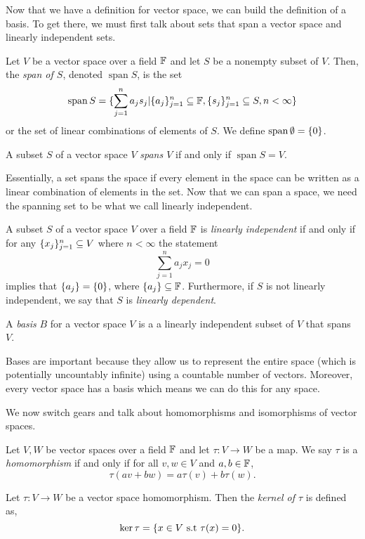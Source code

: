 \documentclass[notitlepage]{simple}
\def\spann{\operatorname{span}}
\begin{document}
	Now that we have a definition for vector space, we can build the definition of a basis.
	To get there, we must first talk about sets that span a vector space and linearly independent sets.

	\begin{definition}
		Let $V$ be a vector space over a field $\mathbb{F}$ and let $S$ be a nonempty subset of $V$.
		Then, the \textit{span of $S$}, denoted $\spann S$, is the set
		\[
			\spann S = \set{\sum_{j=1}^n a_j s_j | \set{a_j}_{j=1}^n\subseteq\FF, \set{s_j}_{j=1}^n\subseteq S, n<\infty}
		\]
		or the set of linear combinations of elements of $S$.
		We define $\spann\emptyset = \set{0}$.
	\end{definition}

	\begin{definition}[Span]
		A subset $S$ of a vector space $V$ \textit{spans $V$} if and only if $\spann S=V$.
	\end{definition}

	Essentially, a set spans the space if every element in the space can be written as a linear combination of elements in the set.
	Now that we can span a space, we need the spanning set to be what we call linearly independent.

	\begin{definition}
		A subset $S$ of a vector space $V$ over a field $\mathbb{F}$ is \textit{linearly independent} if and only if for any $\lbrace x_j \rbrace_{j=1}^n\subseteq V$ where $n<\infty$ the statement
		\[
			\sum_{j=1}^n a_jx_j=0
		\]
		implies that $\lbrace a_j \rbrace=\lbrace 0 \rbrace$, where $\lbrace a_j \rbrace\subseteq\mathbb{F}$.
		Furthermore, if $S$ is not linearly independent, we say that $S$ is \textit{linearly dependent}.
	\end{definition}

	\begin{definition}
		A \textit{basis} $B$ for a vector space $V$ is a a linearly independent subset of $V$ that spans $V$.
	\end{definition}

	Bases are important because they allow us to represent the entire space (which is potentially uncountably infinite) using a countable number of vectors.
	Moreover, every vector space has a basis which means we can do this for any space.

	We now switch gears and talk about homomorphisms and isomorphisms of vector spaces.

	\begin{definition}
		Let $V,W$ be vector spaces over a field $\mathbb{F}$ and let $\tau:V\rightarrow W$ be a map.
		We say $\tau$ is a \textit{homomorphism} if and only if for all $v,w\in V$ and $a,b\in\mathbb{F}$,
		\[
			\tau(av+bw) = a\tau(v)+b\tau(w).
		\]
	\end{definition}
	\begin{definition}
		Let $\tau:V\rightarrow W$ be a vector space homomorphism.
		Then the \textit{kernel of $\tau$} is defined as,
		\[
			\ker\tau=\lbrace x\in V \text{ s.t } \tau(x)=0 \rbrace.
		\]
	\end{definition}
\end{document}
